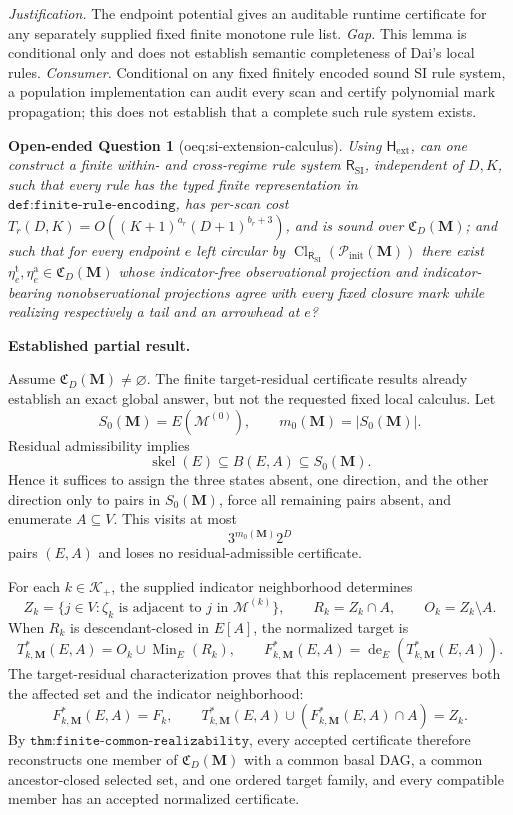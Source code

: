 \documentclass{article}
\newtheorem{openendedquestion}{Open-ended Question}
\begin{document}
\par\smallskip\noindent \textit{Justification.} The endpoint potential gives an auditable runtime certificate for any separately supplied fixed finite monotone rule list. \textit{Gap.} This lemma is conditional only and does not establish semantic completeness of Dai's local rules. \textit{Consumer.} Conditional on any fixed finitely encoded sound SI rule system, a population implementation can audit every scan and certify polynomial mark propagation; this does not establish that a complete such rule system exists.

\begin{openendedquestion}[oeq:si-extension-calculus]\label{oeq:si-extension-calculus}
Using \(\mathsf H_{\mathrm{ext}}\), can one construct a finite within- and cross-regime rule system \(\mathsf R_{\mathrm{SI}}\), independent of \(D,K\), such that every rule has the typed finite representation in \(\texttt{def:finite-rule-encoding}\), has per-scan cost \(T_r(D,K)=O((K+1)^{a_r}(D+1)^{b_r+3})\), and is sound over \(\mathfrak C_D(\mathbf M)\); and such that for every endpoint \(e\) left circular by \(\operatorname{Cl}_{\mathsf R_{\mathrm{SI}}}(\mathcal P_{\mathrm{init}}(\mathbf M))\) there exist \(\eta_e^{\mathrm t},\eta_e^{\mathrm a}\in\mathfrak C_D(\mathbf M)\) whose indicator-free observational projection and indicator-bearing nonobservational projections agree with every fixed closure mark while realizing respectively a tail and an arrowhead at \(e\)?
\end{openendedquestion}
\textbf{Established partial result.}

Assume \(\mathfrak C_D(\mathbf M)\ne\varnothing\).  The finite target-residual certificate results already establish an exact global answer, but not the requested fixed local calculus.  Let
\[
S_0(\mathbf M)=E(\mathcal M^{(0)}),
\qquad
m_0(\mathbf M)=|S_0(\mathbf M)|.
\]
Residual admissibility implies
\[
\operatorname{skel}(E)\subseteq B(E,A)\subseteq S_0(\mathbf M).
\]
Hence it suffices to assign the three states absent, one direction, and the other direction only to pairs in \(S_0(\mathbf M)\), force all remaining pairs absent, and enumerate \(A\subseteq V\).  This visits at most
\[
3^{m_0(\mathbf M)}2^D
\]
pairs \((E,A)\) and loses no residual-admissible certificate.

For each \(k\in\mathcal K_+\), the supplied indicator neighborhood determines
\[
Z_k=\{j\in V:\zeta_k\text{ is adjacent to }j\text{ in }\mathcal M^{(k)}\},
\qquad
R_k=Z_k\cap A,
\qquad
O_k=Z_k\setminus A.
\]
When \(R_k\) is descendant-closed in \(E[A]\), the normalized target is
\[
T^*_{k,\mathbf M}(E,A)=O_k\cup\operatorname{Min}_E(R_k),
\qquad
F^*_{k,\mathbf M}(E,A)=\operatorname{de}_E\!\left(T^*_{k,\mathbf M}(E,A)\right).
\]
The target-residual characterization proves that this replacement preserves both the affected set and the indicator neighborhood:
\[
F^*_{k,\mathbf M}(E,A)=F_k,
\qquad
T^*_{k,\mathbf M}(E,A)\cup(F^*_{k,\mathbf M}(E,A)\cap A)=Z_k.
\]
By \(\texttt{thm:finite-common-realizability}\), every accepted certificate therefore reconstructs one member of \(\mathfrak C_D(\mathbf M)\) with a common basal DAG, a common ancestor-closed selected set, and one ordered target family, and every compatible member has an accepted normalized certificate.
\end{document}
